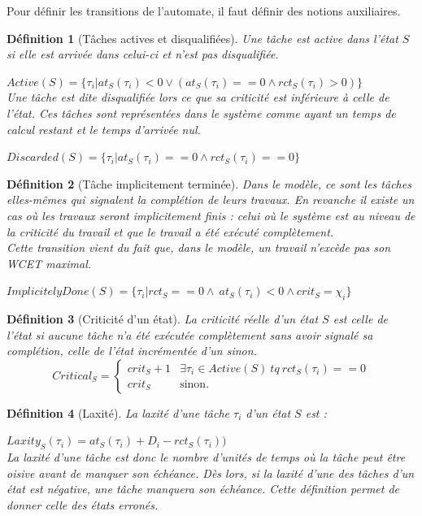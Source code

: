 \documentclass[a4paper]{report}
\theoremstyle{break}
\newtheorem{defin}{Définition}
\theoremstyle{breakplain}
\begin{document}
Pour définir les transitions de l'automate, il faut définir des notions auxiliaires.

\begin{defin}[Tâches actives et disqualifiées]
Une tâche est active dans l'état $S$ si elle est arrivée dans celui-ci et n'est pas disqualifiée.

$Active(S) = \{\tau_i | at_S(\tau_i) < 0\vee (at_S(\tau_i) == 0 \wedge rct_S(\tau_i) > 0)\}$\\

Une tâche est dite disqualifiée lors ce que sa criticité est inférieure à celle de l'état. Ces tâches sont représentées dans le système comme ayant un temps de calcul restant et le temps d'arrivée nul.

$Discarded(S) = \{\tau_i | at_S(\tau_i) == 0 \wedge rct_S(\tau_i) == 0\}$
\end{defin}


\begin{defin}[Tâche implicitement terminée]
Dans le modèle, ce sont les tâches elles-mêmes qui signalent la complétion de leurs travaux. En revanche il existe un cas où les travaux seront implicitement finis : celui où le système est au niveau de la criticité du travail et que le travail a été exécuté complètement.\\
Cette transition vient du fait que, dans le modèle, un travail n'excède pas son WCET maximal.

$ImplicitelyDone(S) = \{\tau_i | rct_S == 0 \wedge\ at_S(\tau_i) < 0\wedge crit_S=\chi_i\}$\\
\end{defin}


\begin{defin}[Criticité d'un état]
La criticité réelle d'un état $S$ est celle de l'état si aucune tâche n'a été exécutée complètement sans avoir signalé sa complétion, celle de l'état incrémentée d'un sinon.
$$
Critical_S = \left\{
    \begin{array}{ll}
        crit_S+1 & \exists \tau_i \in Active(S)\ tq\ rct_S(\tau_i) == 0 \\
        crit_S & \mbox{sinon.}
    \end{array}
\right.
$$
\end{defin}

\begin{defin}[Laxité]
La laxité d'une tâche $\tau_i$ d'un état $S$ est :

$Laxity_S(\tau_i) = at_S(\tau_i)  + D_i - rct_S(\tau_i))$\\

La laxité d'une tâche est donc le nombre d'unités de temps où la tâche peut être oisive avant de manquer son échéance. Dès lors, si la laxité d'une des tâches d'un état est négative, une tâche manquera son échéance. Cette définition permet de donner celle des états erronés.
\end{defin}
\end{document}

